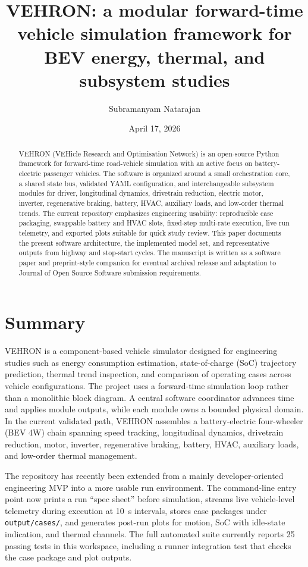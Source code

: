 \documentclass[11pt,a4paper]{article}
\title{VEHRON: a modular forward-time vehicle simulation framework for BEV energy, thermal, and subsystem studies}
\author{Subramanyam Natarajan}
\date{April 17, 2026}
\begin{document}
\maketitle

\begin{abstract}
VEHRON (VEHicle Research and Optimisation Network) is an open-source Python framework for forward-time road-vehicle simulation with an active focus on battery-electric passenger vehicles. The software is organized around a small orchestration core, a shared state bus, validated YAML configuration, and interchangeable subsystem modules for driver, longitudinal dynamics, drivetrain reduction, electric motor, inverter, regenerative braking, battery, HVAC, auxiliary loads, and low-order thermal trends. The current repository emphasizes engineering usability: reproducible case packaging, swappable battery and HVAC slots, fixed-step multi-rate execution, live run telemetry, and exported plots suitable for quick study review. This paper documents the present software architecture, the implemented model set, and representative outputs from highway and stop-start cycles. The manuscript is written as a software paper and preprint-style companion for eventual archival release and adaptation to Journal of Open Source Software submission requirements.
\end{abstract}

\section{Summary}
VEHRON is a component-based vehicle simulator designed for engineering studies such as energy consumption estimation, state-of-charge (SoC) trajectory prediction, thermal trend inspection, and comparison of operating cases across vehicle configurations. The project uses a forward-time simulation loop rather than a monolithic block diagram. A central software coordinator advances time and applies module outputs, while each module owns a bounded physical domain. In the current validated path, VEHRON assembles a battery-electric four-wheeler (BEV 4W) chain spanning speed tracking, longitudinal dynamics, drivetrain reduction, motor, inverter, regenerative braking, battery, HVAC, auxiliary loads, and low-order thermal management.

The repository has recently been extended from a mainly developer-oriented engineering MVP into a more usable run environment. The command-line entry point now prints a run ``spec sheet'' before simulation, streams live vehicle-level telemetry during execution at \SI{10}{\second} intervals, stores case packages under \texttt{output/cases/}, and generates post-run plots for motion, SoC with idle-state indication, and thermal channels. The full automated suite currently reports 25 passing tests in this workspace, including a runner integration test that checks the case package and plot outputs.
\end{document}
